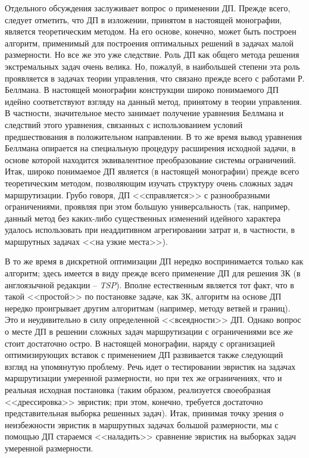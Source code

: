 \documentclass[11pt,twoside,openany]{report}
\begin{document}
Отдельного обсуждения заслуживает вопрос о применении ДП.
Прежде всего, следует отметить, что ДП в изложении,
принятом в настоящей монографии,
является теоретическим методом.
На его основе, конечно, может быть построен алгоритм,
применимый для построения оптимальных решений
в задачах малой размерности. Но все же это уже следствие.
Роль ДП как общего метода решения экстремальных задач
очень велика.
Но, пожалуй, в наибольшей степени эта роль проявляется
в задачах теории управления, что связано прежде всего
с работами Р. Беллмана.
В настоящей монографии конструкции широко понимаемого ДП
идейно соответствуют взгляду на данный метод,
принятому в теории управления.
В частности, значительное место занимает
получение уравнения Беллмана и следствий этого уравнения,
связанных с использованием условий предшествования
в положительном направлении.
В то же время вывод уравнения Беллмана
опирается на специальную процедуру расширения исходной задачи,
в основе которой находится эквивалентное преобразование системы ограничений.
Итак, широко понимаемое ДП является
(в настоящей монографии)
прежде всего теоретическим методом,
позволяющим изучать структуру очень сложных задач маршрутизации.
Грубо говоря, ДП <<справляется>> с разнообразными ограничениями,
проявляя при этом большую универсальность
(так, например, данный метод без каких-либо
существенных изменений идейного характера
удалось использовать при неаддитивном агрегировании затрат и,
в частности, в маршрутных задачах <<на узкие места>>).

В то же время в дискретной оптимизации ДП
нередко воспринимается только как алгоритм;
здесь имеется в виду прежде всего применение
ДП для решения ЗК
(в англоязычной редакции -- \textit{TSP}).
Вполне естественным является тот факт,
что в такой <<простой>> по постановке задаче,
как ЗК, алгоритм на основе ДП нередко проигрывает
другим алгоритмам
(например, методу ветвей и границ).
Это и неудивительно в силу определенной <<всеядности>> ДП.
Однако вопрос о месте ДП в решении
сложных задач маршрутизации с ограничениями
все же стоит достаточно остро.
В настоящей монографии, наряду с организацией оптимизирующих вставок
с применением ДП
развивается также следующий взгляд
на упомянутую проблему.
Речь идет о тестировании эвристик на
задачах маршрутизации умеренной размерности,
но при тех же ограничениях,
что и реальная исходная постановка
(таким образом, реализуется своеобразная
<<дрессировка>> эвристик; при этом,
конечно, требуется достаточно представительная выборка решенных задач).
Итак, принимая точку зрения о неизбежности эвристик
в маршрутных задачах большой размерности,
мы с помощью ДП стараемся <<наладить>>
сравнение эвристик на выборках задач умеренной размерности.
\end{document}
